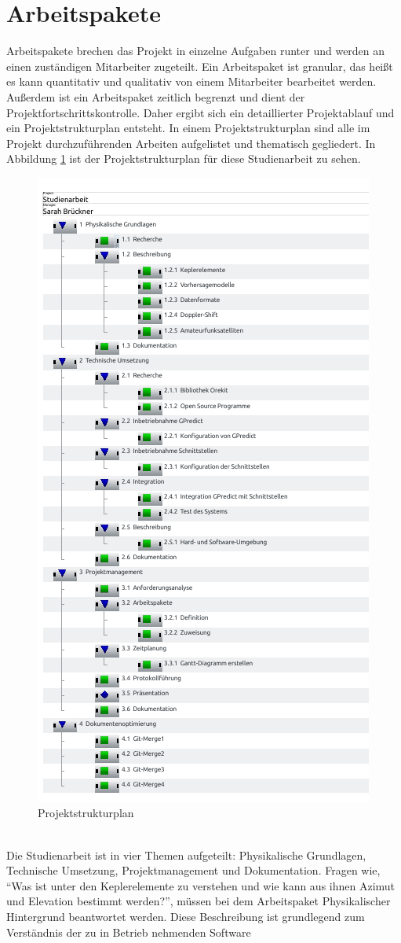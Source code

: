 \section{Arbeitspakete}
Arbeitspakete brechen das Projekt in einzelne Aufgaben runter und werden an einen 
zuständigen Mitarbeiter zugeteilt. Ein Arbeitspaket ist granular, das heißt es kann quantitativ und 
qualitativ von einem Mitarbeiter bearbeitet werden. Außerdem ist ein Arbeitspaket zeitlich begrenzt 
und dient der Projektfortschrittskontrolle. 
Daher ergibt sich ein detaillierter Projektablauf und ein Projektstrukturplan entsteht. In einem 
Projektstrukturplan sind alle im Projekt durchzuführenden Arbeiten aufgelistet und thematisch 
gegliedert. In Abbildung \ref{fig:projektstruktur} ist der Projektstrukturplan für diese Studienarbeit zu sehen.
\begin{figure}[h]
 \centering
\includegraphics[width=0.5\linewidth]{./images/00tasks}
\caption{Projektstrukturplan}
 \label{fig:projektstruktur}
\end{figure}
\\
Die Studienarbeit ist in vier Themen aufgeteilt: Physikalische Grundlagen, Technische Umsetzung, 
Projektmanagement und Dokumentation. Fragen wie, ``Was ist unter den Keplerelemente zu 
verstehen und wie kann aus ihnen Azimut und Elevation bestimmt werden?'', müssen bei dem Arbeitspaket Physikalischer Hintergrund  beantwortet 
werden. Diese Beschreibung ist grundlegend zum Verständnis der zu in Betrieb nehmenden Software 
